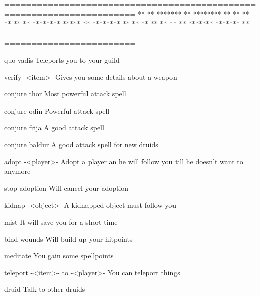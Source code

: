 ======================================================================
              **    **   *******  **      ********
              **    **   **       **      **     **
              ********   *****    **      ********
              **    **   **       **      **
              **    **   *******  ******* **
======================================================================
 
 
 
        quo vadis            Teleports you to your guild
 
        verify -<item>-      Gives you some details about a weapon
 
        conjure thor         Most powerful attack spell
	
        conjure odin         Powerful attack spell
 
        conjure frija        A good attack spell
 
        conjure baldur       A good attack spell for new druids
 
        adopt -<player>-     Adopt a player an he will follow you till
                             he doesn't want to anymore
 
        stop adoption        Will cancel your adoption
 
        kidnap -<object>-    A kidnapped object must follow you
 
        mist                 It will save you for a short time
 
        bind wounds          Will build up your hitpoints
 
        meditate             You gain some spellpoints
 
        teleport -<item>- to -<player>-  You can teleport things

        druid                Talk to other druids
 
 
